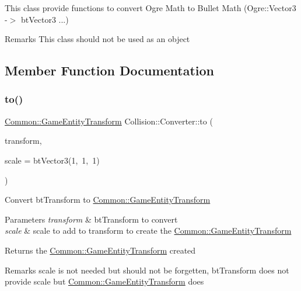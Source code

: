 This class provide functions to convert Ogre Math to Bullet Math (Ogre\+::\+Vector3 -\/$>$ bt\+Vector3 ...) \begin{DoxyRemark}{Remarks}
This class should not be used as an object 
\end{DoxyRemark}


\subsection{Member Function Documentation}
\mbox{\label{class_collision_1_1_converter_a1b08b8571e6e0973029e6eb492cd7888}} 
\subsubsection{\texorpdfstring{to()}{to()}\hspace{0.1cm}{\footnotesize\ttfamily [1/6]}}
{\footnotesize\ttfamily \hyperlink{struct_common_1_1_game_entity_transform}{Common\+::\+Game\+Entity\+Transform} Collision\+::\+Converter\+::to (\begin{DoxyParamCaption}\item[{const bt\+Transform \&}]{transform,  }\item[{bt\+Vector3}]{scale = {\ttfamily btVector3(1,~1,~1)} }\end{DoxyParamCaption})\hspace{0.3cm}{\ttfamily [static]}}

Convert bt\+Transform to \hyperlink{struct_common_1_1_game_entity_transform}{Common\+::\+Game\+Entity\+Transform} 
\begin{DoxyParams}{Parameters}
{\em transform} & bt\+Transform to convert \\
\hline
{\em scale} & scale to add to transform to create the \hyperlink{struct_common_1_1_game_entity_transform}{Common\+::\+Game\+Entity\+Transform} \\
\hline
\end{DoxyParams}
\begin{DoxyReturn}{Returns}
the \hyperlink{struct_common_1_1_game_entity_transform}{Common\+::\+Game\+Entity\+Transform} created 
\end{DoxyReturn}
\begin{DoxyRemark}{Remarks}
scale is not needed but should not be forgetten, bt\+Transform does not provide scale but \hyperlink{struct_common_1_1_game_entity_transform}{Common\+::\+Game\+Entity\+Transform} does 
\end{DoxyRemark}
\mbox{\label{class_collision_1_1_converter_a532db90a9789b9fdabe21bd5e8f0fcfc}} 
